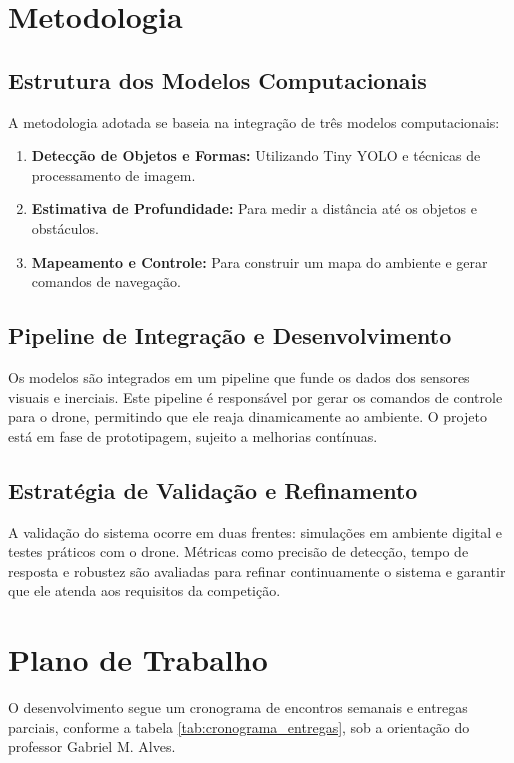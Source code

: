 \documentclass{SBCbookchapter}
\begin{document}
\section{Metodologia}

\subsection{Estrutura dos Modelos Computacionais}
A metodologia adotada se baseia na integração de três modelos computacionais:
\begin{enumerate}
    \item \textbf{Detecção de Objetos e Formas:} Utilizando Tiny YOLO e técnicas de processamento de imagem.
    \item \textbf{Estimativa de Profundidade:} Para medir a distância até os objetos e obstáculos.
    \item \textbf{Mapeamento e Controle:} Para construir um mapa do ambiente e gerar comandos de navegação.
\end{enumerate}

\subsection{Pipeline de Integração e Desenvolvimento}
Os modelos são integrados em um pipeline que funde os dados dos sensores visuais e inerciais. Este pipeline é responsável por gerar os comandos de controle para o drone, permitindo que ele reaja dinamicamente ao ambiente. O projeto está em fase de prototipagem, sujeito a melhorias contínuas.


\subsection{Estratégia de Validação e Refinamento}
A validação do sistema ocorre em duas frentes: simulações em ambiente digital e testes práticos com o drone. Métricas como precisão de detecção, tempo de resposta e robustez são avaliadas para refinar continuamente o sistema e garantir que ele atenda aos requisitos da competição.

\section{Plano de Trabalho}
O desenvolvimento segue um cronograma de encontros semanais e entregas parciais, conforme a tabela \ref{tab:cronograma_entregas}, sob a orientação do professor Gabriel M. Alves.
\end{document}
